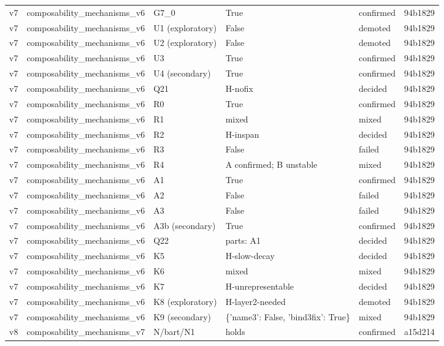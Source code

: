 \begin{longtable}{llllll}
v7 & composability\_mechanisms\_v6 & G7\_0 & True & confirmed & 94b1829 \\
v7 & composability\_mechanisms\_v6 & U1 (exploratory) & False & demoted & 94b1829 \\
v7 & composability\_mechanisms\_v6 & U2 (exploratory) & False & demoted & 94b1829 \\
v7 & composability\_mechanisms\_v6 & U3 & True & confirmed & 94b1829 \\
v7 & composability\_mechanisms\_v6 & U4 (secondary) & True & confirmed & 94b1829 \\
v7 & composability\_mechanisms\_v6 & Q21 & H-nofix & decided & 94b1829 \\
v7 & composability\_mechanisms\_v6 & R0 & True & confirmed & 94b1829 \\
v7 & composability\_mechanisms\_v6 & R1 & mixed & mixed & 94b1829 \\
v7 & composability\_mechanisms\_v6 & R2 & H-inspan & decided & 94b1829 \\
v7 & composability\_mechanisms\_v6 & R3 & False & failed & 94b1829 \\
v7 & composability\_mechanisms\_v6 & R4 & A confirmed; B unstable & mixed & 94b1829 \\
v7 & composability\_mechanisms\_v6 & A1 & True & confirmed & 94b1829 \\
v7 & composability\_mechanisms\_v6 & A2 & False & failed & 94b1829 \\
v7 & composability\_mechanisms\_v6 & A3 & False & failed & 94b1829 \\
v7 & composability\_mechanisms\_v6 & A3b (secondary) & True & confirmed & 94b1829 \\
v7 & composability\_mechanisms\_v6 & Q22 & parts: A1 & decided & 94b1829 \\
v7 & composability\_mechanisms\_v6 & K5 & H-slow-decay & decided & 94b1829 \\
v7 & composability\_mechanisms\_v6 & K6 & mixed & mixed & 94b1829 \\
v7 & composability\_mechanisms\_v6 & K7 & H-unrepresentable & decided & 94b1829 \\
v7 & composability\_mechanisms\_v6 & K8 (exploratory) & H-layer2-needed & demoted & 94b1829 \\
v7 & composability\_mechanisms\_v6 & K9 (secondary) & \{'name3': False, 'bind3fix': True\} & mixed & 94b1829 \\
v8 & composability\_mechanisms\_v7 & N/bart/N1 & holds & confirmed & a15d214 \\

\end{longtable}
